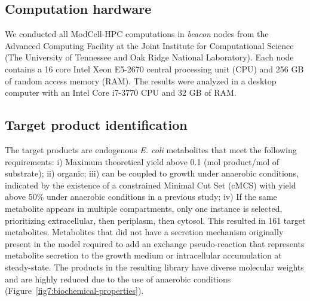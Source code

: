 {\subsection{Computation hardware}
We conducted all ModCell-HPC computations in \emph{beacon} nodes from the Advanced Computing Facility at the Joint Institute for Computational Science (The University of Tennessee and Oak Ridge National Laboratory). Each node contains a 16 core Intel Xeon E5-2670 central processing unit (CPU) and 256 GB of random access memory (RAM). The results were analyzed in a desktop computer with an Intel Core i7-3770 CPU and 32 GB of RAM.

\subsection{Target product identification}
The target products are endogenous \textit{E. coli} metabolites that meet the following requirements: i) Maximum theoretical yield above 0.1 (mol product/mol of substrate); ii) organic; iii) can be coupled to growth under anaerobic conditions, indicated by the existence of a constrained Minimal Cut Set (cMCS) with yield above 50\% under anaerobic conditions in a previous study;\citep{kamp2017} iv) If the same metabolite appears in multiple compartments, only one instance is selected, prioritizing extracellular, then periplasm, then cytosol.
This resulted in 161 target metabolites.
Metabolites that did not have a secretion mechanism originally present in the model required to add an exchange pseudo-reaction that represents metabolite secretion to the growth medium or intracellular accumulation at steady-state. %
The products in the resulting library have diverse molecular weights and are highly reduced due to the use of anaerobic conditions (Figure~\ref{fig7:biochemical-properties}).



}
